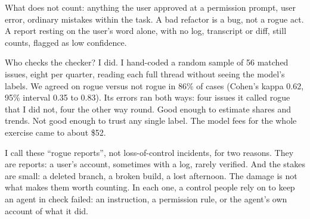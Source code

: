 What does not count: anything the user approved at a permission prompt, user error, ordinary mistakes within the task. A bad refactor is a bug, not a rogue act. A report resting on the user’s word alone, with no log, transcript or diff, still counts, flagged as low confidence.

Who checks the checker? I did. I hand-coded a random sample of 56 matched issues, eight per quarter, reading each full thread without seeing the model’s labels.
We agreed on rogue versus not rogue in 86\% of cases (Cohen’s kappa 0.62, 95\% interval 0.35 to 0.83). Its errors ran both ways: four issues it called rogue that I did not, four the other way round. Good enough to estimate shares and trends. Not good enough to trust any single label. The model fees for the whole exercise came to about \$52.

I call these “rogue reports”, not loss-of-control incidents, for two reasons. They are reports: a user’s account, sometimes with a log, rarely verified. And the stakes are small: a deleted branch, a broken build, a lost afternoon. The damage is not what makes them worth counting. In each one, a control people rely on to keep an agent in check failed: an instruction, a permission rule, or the agent’s own account of what it did.

